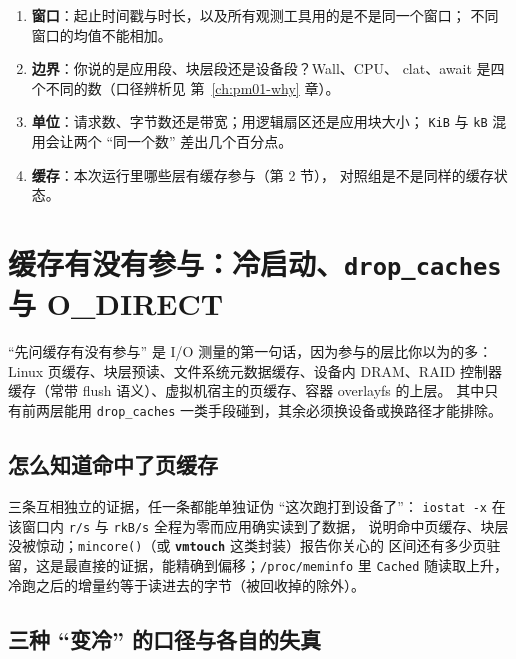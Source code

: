 \documentclass[12pt,a4paper,fontset=fandol]{ctexbook}
\newcommand{\Fn}[1]{\texttt{#1()}}
\newcommand{\Tp}[1]{\texttt{#1}}
\newcommand{\Lib}[1]{\textbf{\texttt{#1}}}
\newcommand{\Lang}[1]{\textsf{#1}}
\newcommand{\MWall}{\Lang{Wall}}
\newcommand{\MCpu}{\Lang{CPU}}
\newcommand{\Mx}[1]{\textsf{#1}}
\begin{document}
\begin{guideline}[title={写一份能辩护的 I/O 结论之前，先钉死这四个边界}]
\begin{enumerate}
\item \textbf{窗口}：起止时间戳与时长，以及所有观测工具用的是不是同一个窗口；
  不同窗口的均值不能相加。
\item \textbf{边界}：你说的是应用段、块层段还是设备段？\MWall{}、\MCpu{}、
  \Mx{clat}、\Mx{await} 是四个不同的数（口径辨析见 第~\ref{ch:pm01-why} 章）。
\item \textbf{单位}：请求数、字节数还是带宽；用逻辑扇区还是应用块大小；
  \Tp{KiB} 与 \Tp{kB} 混用会让两个 ``同一个数'' 差出几个百分点。
\item \textbf{缓存}：本次运行里哪些层有缓存参与（第 2 节），
  对照组是不是同样的缓存状态。
\end{enumerate}
\end{guideline}

\section{缓存有没有参与：冷启动、\Tp{drop\_caches} 与 O\_DIRECT}
\label{sec:pm08-cache}

``先问缓存有没有参与'' 是 I/O 测量的第一句话，因为参与的层比你以为的多：
Linux 页缓存、块层预读、文件系统元数据缓存、设备内 DRAM、RAID 控制器缓存（常带
flush 语义）、虚拟机宿主的页缓存、容器 overlayfs 的上层。
其中只有前两层能用 \Tp{drop\_caches} 一类手段碰到，其余必须换设备或换路径才能排除。

\subsection{怎么知道命中了页缓存}
\label{sub:pm08-hit}

三条互相独立的证据，任一条都能单独证伪 ``这次跑打到设备了''：
\Tp{iostat -x} 在该窗口内 \Tp{r/s} 与 \Tp{rkB/s} 全程为零而应用确实读到了数据，
说明命中页缓存、块层没被惊动；\Fn{mincore}（或 \Lib{vmtouch} 这类封装）报告你关心的
区间还有多少页驻留，这是最直接的证据，能精确到偏移；\Tp{/proc/meminfo} 里 \Tp{Cached}
随读取上升，冷跑之后的增量约等于读进去的字节（被回收掉的除外）。

\subsection{三种 ``变冷'' 的口径与各自的失真}
\label{sub:pm08-cold}
\end{document}
